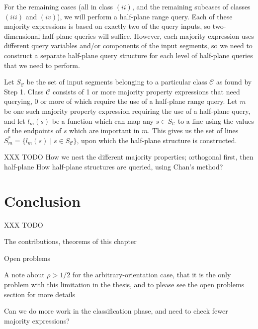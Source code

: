For the remaining cases (all in class $(ii)$, and the remaining subcases of classes $(iii)$ and $(iv)$), we will perform a half-plane range query. Each of these majority expressions is based on exactly two of the query inputs, so two-dimensional half-plane queries will suffice.  However, each majority expression uses different query variables and/or components of the input segments, so we need to construct a separate half-plane query structure for each level of half-plane queries that we need to perform.

Let $S_{\mathcal{C}}$ be the set of input segments belonging to a particular class $\mathcal{C}$ as found by Step 1. Class $\mathcal{C}$ consists of 1 or more majority property expressions that need querying, 0 or more of which require the use of a half-plane range query. Let $m$ be one such majority property expression requiring the use of a half-plane query, and let $l_m(s)$ be a function which can map any $s \in S_{\mathcal{C}}$ to a line using the values of the endpoints of $s$ which are important in $m$. This gives us the set of lines $S_m^* = \{ l_m(s) \; | \; s \in S_{\mathcal{C}} \}$, upon which the half-plane structure is constructed.


XXX TODO
How we nest the different majority properties; orthogonal first, then half-plane
How half-plane structures are queried, using Chan's method?




\section{Conclusion}
\label{:rectangles:concl}

XXX TODO

The contributions, theorems of this chapter

Open problems

A note about $\rho > 1/2$ for the arbitrary-orientation case, that it is the only problem with this limitation in the thesis, and to please see the open problems section for more details

Can we do more work in the classification phase, and need to check fewer majority expressions?
